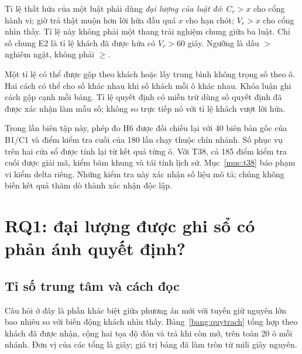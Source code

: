 Tỉ lệ thất hứa của một luật phải dùng \emph{đại lượng của luật đó}: $C_r>x$ cho cổng hành
vi; giờ trả thật muộn hơn lời hứa đầu quá $x$ cho hạn chót; $V_r>x$ cho cổng nhìn thấy.
Tỉ lệ này không phải một thang trải nghiệm chung giữa ba luật. Chỉ số chung E2 là tỉ lệ
khách đã được hứa có $V_r>60$ giây. Ngưỡng là dấu $>$ nghiêm ngặt, không phải $\ge$.

Một tỉ lệ có thể được gộp theo khách hoặc lấy trung bình không trọng số theo ô. Hai cách
có thể cho số khác nhau khi số khách mỗi ô khác nhau. Khóa luận ghi cách gộp cạnh mỗi bảng.
Tỉ lệ quyết định có miễn trừ dùng số quyết định đã được xác nhận làm mẫu số; không so
trực tiếp nó với tỉ lệ khách vượt lời hứa.

Trong lần biên tập này, phép đo H6 được đối chiếu lại với 40 biên bản gốc của B1/C1 và
điểm kiểm tra cuối của 180 lần chạy thuộc chín nhánh. Số phục vụ trên hai cửa sổ được
tính lại từ kết quả từng ô. Với T38, cả 185 điểm kiểm tra cuối được giải mã, kiểm băm
khung và tái tính lịch sử. Mục~\ref{muc:t38} báo phạm vi kiểm delta riêng. Những kiểm
tra này xác nhận số liệu mô tả; chúng không biến kết quả thăm dò thành xác nhận độc lập.

\section{RQ1: đại lượng được ghi sổ có phản ánh quyết định?}
\label{muc:quytrach}

\subsection{Tỉ số trung tâm và cách đọc}

Câu hỏi ở đây là phần khác biệt giữa phương án mới với tuyến giữ nguyên lớn bao nhiêu so
với biến động khách nhìn thấy. Bảng~\ref{bang:quytrach} tổng hợp theo khách đã được nhận,
cộng hai tọa độ đón và trả khi còn mở, trên toàn 20 ô mỗi nhánh. Đơn vị của các tổng là
giây; giá trị bảng đã làm tròn từ mili giây nguyên.

